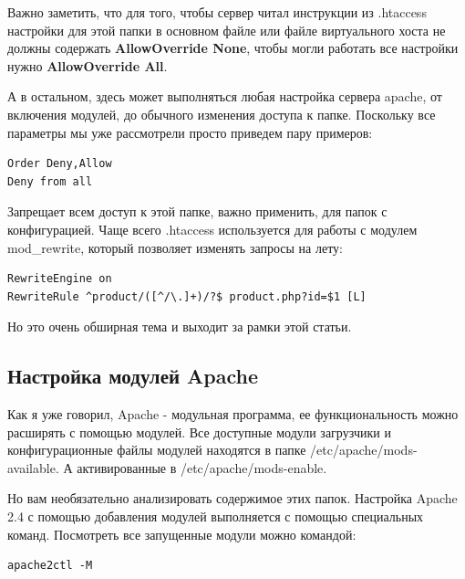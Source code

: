 \documentclass[14pt, a4paper]{article}
\begin{document}
Важно заметить, что для того, чтобы сервер читал инструкции из .htaccess настройки для 
этой папки в основном файле или файле виртуального хоста не должны содержать \textbf{AllowOverride None}, 
чтобы могли работать все настройки нужно \textbf{AllowOverride All}.

А в остальном, здесь может выполняться любая настройка сервера apache, от включения модулей, 
до обычного изменения доступа к папке. Поскольку все параметры мы уже рассмотрели просто приведем пару примеров:
\begin{lstlisting}
Order Deny,Allow
Deny from all
\end{lstlisting}
Запрещает всем доступ к этой папке, важно применить, для папок с конфигурацией. Чаще всего .htaccess используется для работы с модулем mod\_rewrite, который 
позволяет изменять запросы на лету:
\begin{lstlisting}
RewriteEngine on
RewriteRule ^product/([^/\.]+)/?$ product.php?id=$1 [L]
\end{lstlisting}
Но это очень обширная тема и выходит за рамки этой статьи.


\subsection*{Настройка модулей Apache}

Как я уже говорил, Apache - модульная программа, ее функциональность можно расширять с помощью модулей. 
Все доступные модули загрузчики и конфигурационные файлы модулей находятся в папке /etc/apache/mods-available. 
А активированные в /etc/apache/mods-enable.

Но вам необязательно анализировать содержимое этих папок. Настройка Apache 2.4 с помощью добавления 
модулей выполняется с помощью специальных команд. Посмотреть все запущенные модули можно командой:

\begin{lstlisting}
apache2ctl -M
\end{lstlisting}

\begin{figure}[h]%
    \centering
    \label{1.8}
\end{figure}
\end{document}
